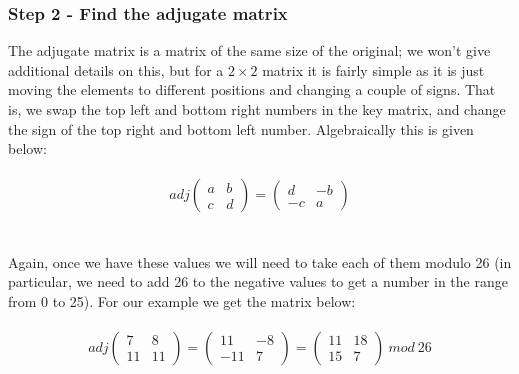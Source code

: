 \documentclass[Lau,binding=0.6cm,oneside]{sapthesis}
\begin{document}
\subsubsection{Step 2 - Find the adjugate matrix}
The adjugate matrix is a matrix of the same size of the original; we won't give additional details on this, but for a $2 \times 2$ matrix it is fairly simple as it is just moving the elements to different positions and changing a couple of signs. That is, we swap the top left and bottom right numbers in the key matrix, and change the sign of the top right and bottom left number. Algebraically this is given below:\\\\
\begin{equation}
adj\begin{pmatrix}a&b\\c&d\end{pmatrix} = \begin{pmatrix}d&-b\\-c&a\end{pmatrix}
\end{equation}
\ \\\\
Again, once we have these values we will need to take each of them modulo 26 (in particular, we need to add 26 to the negative values to get a number in the range from 0 to 25). For our example we get the matrix below:\\\\
\begin{equation}
adj \begin{pmatrix} 7 & 8 \\ 11 & 11 \end{pmatrix} = 
\begin{pmatrix} 11 & -8 \\ -11 & 7 \end{pmatrix} = 
\begin{pmatrix} 11 & 18 \\ 15 & 7 \end{pmatrix} \ mod \ 26
\end{equation}
\ \\
\end{document}
